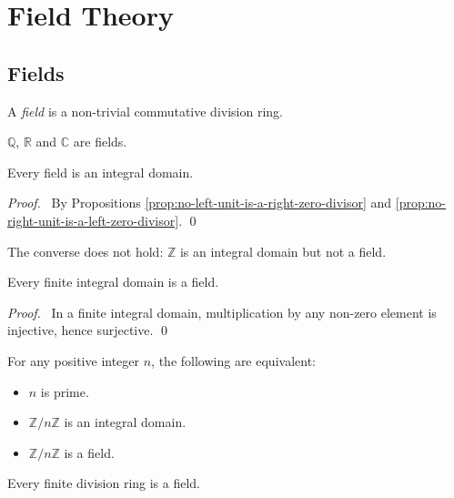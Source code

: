 \part{Field Theory}

\chapter{Fields}

\begin{df}[Field]
A \emph{field} is a non-trivial commutative division ring.
\end{df}

\begin{ex}
$\mathbb{Q}$, $\mathbb{R}$ and $\mathbb{C}$ are fields.
\end{ex}

\begin{prop}
Every field is an integral domain.
\end{prop}

\begin{proof}
\pf\ By Propositions \ref{prop:no-left-unit-is-a-right-zero-divisor} and \ref{prop:no-right-unit-is-a-left-zero-divisor}. \qed
\end{proof}

\begin{ex}
The converse does not hold: $\mathbb{Z}$ is an integral domain but not a field.
\end{ex}

\begin{prop}
Every finite integral domain is a field.
\end{prop}

\begin{proof}
\pf\ In a finite integral domain, multiplication by any non-zero element is injective, hence surjective. \qed
\end{proof}

\begin{cor}
For any positive integer $n$, the following are equivalent:
\begin{itemize}
\item $n$ is prime.
\item $\mathbb{Z} / n \mathbb{Z}$ is an integral domain.
\item $\mathbb{Z} / n \mathbb{Z}$ is a field.
\end{itemize}
\end{cor}

\begin{thm}
Every finite division ring is a field.
\end{thm}

